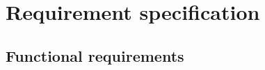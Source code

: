 \chapter{Requirement specification}
\section{Functional requirements}

\begin{comment}
\subsection{Device control/overview}
\begin{itemize}
\item The user should be able to monitor his energy usage.
\begin{itemize}
\item The user should be able to see which devices in his house that actually use electricity, real time.
\item The user should be able to see how much electricity each device in his house use on an average basis, on a monthly basis and on a yearly basis.
\end{itemize}

\item The user should be able to turn devices on and off from within the application.
\begin{itemize}
\item If a device's power consumption becomes too high, the user should be able to turn it off.
\item The user should be able to turn on devices, for instance the heat in his house, from the application. An example of such a use can be if the user wants the heat to turn on before he comes home.
\item The user should have the ability to schedule when he want a device to consume power. If he want the heat to be off while he is at work, for instance. 
\item The user should have the ability to specify a maximum of power 
consumption per day for a given device and be notified if the device's power
consumption reaches that limit. This functionality will not be available
for critical devices such as refrigerators. 
\end{itemize}

\item The user should be able to monitor and control his energy production.
\begin{itemize}
\item In the same way the user can see his energy usage. Be able to add devices producing power and control how much they produce.
\end{itemize}
\end{itemize}


\end{comment}
